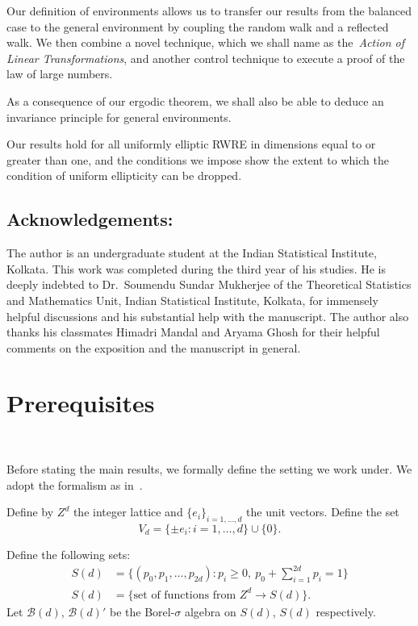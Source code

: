\documentclass[final]{aomart}
\def\mathscr#1{#1}%
\def\mathbb#1{#1}%
\theoremstyle{plain}
\theoremstyle{definition}
\theoremstyle{remark}
\begin{document}
Our definition of environments allows us to transfer our results from the balanced case to the general environment by coupling the random walk and a reflected walk. We then combine a novel technique, which we shall name as the~\textit{Action of Linear Transformations}, and another control technique to execute a proof of the law of large numbers.

As a consequence of our ergodic theorem, we shall also be able to deduce an invariance principle for general environments. 

Our results hold for all uniformly elliptic RWRE in dimensions equal to or greater than one, and the conditions we impose show the extent to which the condition of uniform ellipticity can be dropped.
\subsection*{Acknowledgements:} The author is an undergraduate student at the Indian Statistical Institute, Kolkata. This work was completed during the third year of his studies. He is deeply indebted to Dr.~Soumendu Sundar Mukherjee of the Theoretical Statistics and Mathematics Unit, Indian Statistical Institute, Kolkata, for immensely helpful discussions and his substantial help with the manuscript. The author also thanks his classmates Himadri Mandal and Aryama Ghosh for their helpful comments on the exposition and the manuscript in general. \\
\section{Prerequisites}~\label{preq}

Before stating the main results, we formally define the setting we work under. We adopt the formalism as in~\cite{Lawler1982}. 
 
Define by $\mathbb{Z}^d$ the integer lattice and $\{e_i\}_{i=1,\dots,d}$ the unit vectors. Define the set \[
V_d = \{ \pm e_i : i=1,\dots ,d\} \cup \{0\}.
\]

Define the following sets:
\begin{align*}
S(d) 
&= \{ (p_0,p_1,\dots ,p_{2d}) : p_i \ge 0,\ p_0 + \sum_{i=1}^{2d} p_i = 1 \} \\
\mathscr{S}(d) 
&= \{ \text{set of functions from } \mathbb{Z}^d \to S(d) \}.
\end{align*}
Let $\mathcal{B}(d)$, $\mathcal{B}(d)'$ be the Borel-$\sigma$ algebra on $S(d)$, $\mathscr{S}(d)$ respectively.
\end{document}
